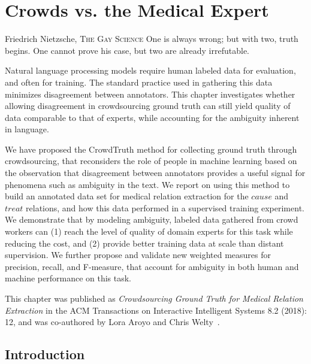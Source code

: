 \chapter{Crowds vs. the Medical Expert}
\label{chap:med-rel-ex}

\begin{chapquote}{Friedrich Nietzsche, \textsc{The Gay Science}}
One is always wrong; but with two, truth begins. One cannot prove his case, but two are already irrefutable.
\end{chapquote}

Natural language processing models require human labeled data for evaluation, and often for training. The standard practice used in gathering this data minimizes disagreement between annotators. This chapter investigates whether allowing disagreement in crowdsourcing ground truth can still yield quality of data comparable to that of experts, while accounting for the ambiguity inherent in language.

We have proposed the CrowdTruth method for collecting ground truth through crowdsourcing, that reconsiders the role of people in machine learning based on the observation that disagreement between annotators provides a useful signal for phenomena such as ambiguity in the text. We report on using this method to build an annotated data set for medical relation extraction for the $cause$ and $treat$ relations, and how this data performed in a supervised training experiment. We demonstrate that by modeling ambiguity, labeled data gathered from crowd workers can (1) reach the level of quality of domain experts for this task while reducing the cost, and (2) provide better training data at scale than distant supervision. We further propose and validate new weighted measures for precision, recall, and F-measure, that account for ambiguity in both human and machine performance on this task.

This chapter was published as \textit{Crowdsourcing Ground Truth for Medical Relation Extraction} in the ACM Transactions on Interactive Intelligent Systems 8.2 (2018): 12, and was co-authored by Lora Aroyo and Chris Welty~\cite{DBLP:journals/corr/DumitracheAW17}.


\section{Introduction}

